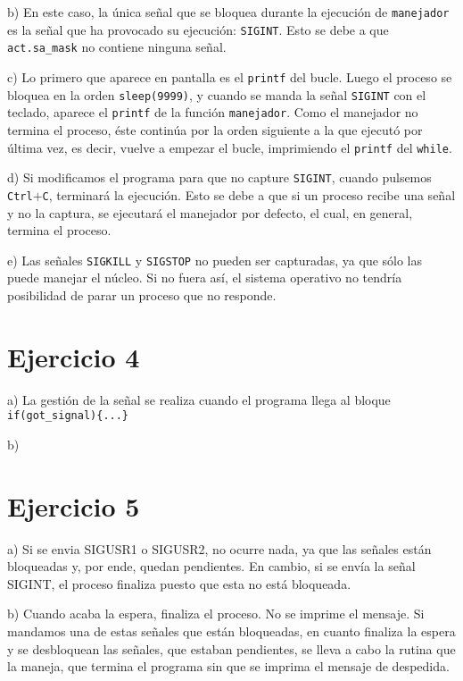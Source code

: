\documentclass{article}
\begin{document}
b) En este caso, la única señal que se bloquea durante la ejecución de \texttt{manejador} es la señal que ha provocado su ejecución: \texttt{SIGINT}. Esto se debe a que \texttt{act.sa\_mask} no contiene ninguna señal.

c) Lo primero que aparece en pantalla es el \texttt{printf} del bucle. Luego el proceso se bloquea en la orden \texttt{sleep(9999)}, y cuando se manda la señal \texttt{SIGINT} con el teclado, aparece el \texttt{printf} de la función \texttt{manejador}. Como el manejador no termina el proceso, éste continúa por la orden siguiente a la que ejecutó por última vez, es decir, vuelve a empezar el bucle, imprimiendo el \texttt{printf} del \texttt{while}.

d) Si modificamos el programa para que no capture \texttt{SIGINT}, cuando pulsemos \texttt{Ctrl}$+$\texttt{C}, terminará la ejecución. Esto se debe a que si un proceso recibe una señal y no la captura, se ejecutará el manejador por defecto, el cual, en general, termina el proceso.

e) Las señales \texttt{SIGKILL} y \texttt{SIGSTOP} no pueden ser capturadas, ya que sólo las puede manejar el núcleo. Si no fuera así, el sistema operativo no tendría posibilidad de parar un proceso que no responde. 

\section*{Ejercicio 4}
a) La gestión de la señal se realiza cuando el programa llega al bloque \texttt{if(got\_signal)\{...\}}

b)

\section*{Ejercicio 5}
a) Si se envia SIGUSR1 o SIGUSR2, no ocurre nada, ya que las señales están bloqueadas y, por ende, quedan pendientes. En cambio, si se envía la señal SIGINT, el proceso finaliza puesto que esta no está bloqueada.

b) Cuando acaba la espera, finaliza el proceso. No se imprime el mensaje. Si mandamos una de estas señales que están bloqueadas, en cuanto finaliza la espera y se desbloquean las señales, que estaban pendientes, se lleva a cabo la rutina que la maneja, que termina el programa sin que se imprima el mensaje de despedida.

\end{document}

